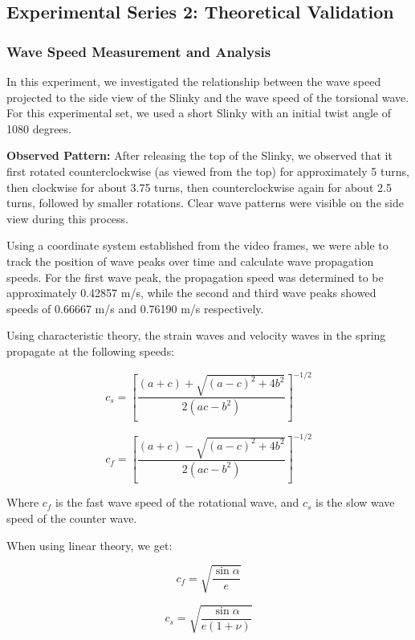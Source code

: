 \documentclass{mcmthesis}  %
\begin{document}
\subsection{Experimental Series 2: Theoretical Validation}

\subsubsection{Wave Speed Measurement and Analysis}
In this experiment, we investigated the relationship between the wave speed projected to the side view of the Slinky and the wave speed of the torsional wave. For this experimental set, we used a short Slinky with an initial twist angle of 1080 degrees.

\textbf{Observed Pattern:} After releasing the top of the Slinky, we observed that it first rotated counterclockwise (as viewed from the top) for approximately 5 turns, then clockwise for about 3.75 turns, then counterclockwise again for about 2.5 turns, followed by smaller rotations. Clear wave patterns were visible on the side view during this process.

Using a coordinate system established from the video frames, we were able to track the position of wave peaks over time and calculate wave propagation speeds. For the first wave peak, the propagation speed was determined to be approximately 0.42857 m/s, while the second and third wave peaks showed speeds of 0.66667 m/s and 0.76190 m/s respectively.

Using characteristic theory, the strain waves and velocity waves in the spring propagate at the following speeds:

\begin{equation}
c_s = \left[\frac{(a+c) + \sqrt{(a-c)^2 + 4b^2}}{2(ac - b^2)}\right]^{-1/2}
\end{equation}

\begin{equation}
c_f = \left[\frac{(a+c) - \sqrt{(a-c)^2 + 4b^2}}{2(ac - b^2)}\right]^{-1/2}
\end{equation}

Where $c_f$ is the fast wave speed of the rotational wave, and $c_s$ is the slow wave speed of the counter wave.

When using linear theory, we get:

\begin{equation}
c_f = \sqrt{\frac{\sin \alpha}{e}}
\end{equation}

\begin{equation}
c_s = \sqrt{\frac{\sin \alpha}{e(1 + \nu)}}
\end{equation}
\end{document}

